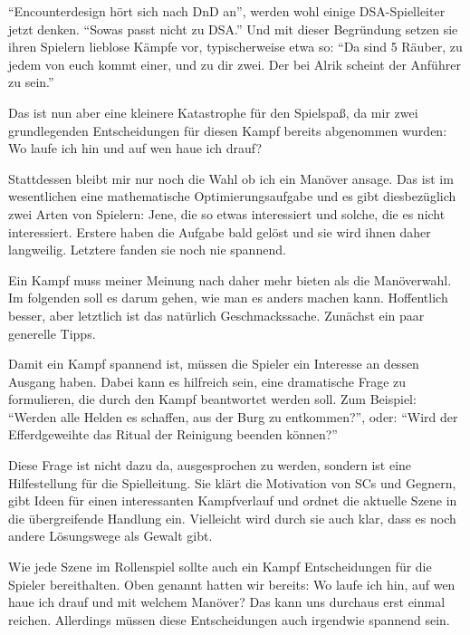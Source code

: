 



\spaltenanfang
{}
\enquote{Encounterdesign hört sich nach DnD an}, werden wohl einige DSA-Spielleiter jetzt denken. \enquote{Sowas passt nicht zu DSA.}
Und mit dieser Begründung setzen sie ihren Spielern lieblose Kämpfe vor, typischerweise etwa so:
\enquote{Da sind 5 Räuber, zu jedem von euch kommt einer, und zu dir zwei. Der bei Alrik scheint der Anführer zu sein.}

Das ist nun aber eine kleinere Katastrophe für den Spielspaß, da mir zwei grundlegenden Entscheidungen für diesen Kampf bereits abgenommen wurden:
Wo laufe ich hin und auf wen haue ich drauf?

Stattdessen bleibt mir nur noch die Wahl ob ich ein Manöver ansage.
Das ist im wesentlichen eine mathematische Optimierungsaufgabe und es gibt diesbezüglich zwei Arten von Spielern:
Jene, die so etwas interessiert und solche, die es nicht interessiert.
Erstere haben die Aufgabe bald gelöst und sie wird ihnen daher langweilig. Letztere fanden sie noch nie spannend.

Ein Kampf muss meiner Meinung nach daher mehr bieten als die Manöverwahl.
Im folgenden soll es darum gehen, wie man es anders machen kann.
Hoffentlich besser, aber letztlich ist das natürlich Geschmackssache.
Zunächst ein paar generelle Tipps.

Damit ein Kampf spannend ist, müssen die Spieler ein Interesse an dessen Ausgang haben.
Dabei kann es hilfreich sein, eine dramatische Frage zu formulieren, die durch den Kampf beantwortet werden soll.
Zum Beispiel: \enquote{Werden alle Helden es schaffen, aus der Burg zu entkommen?},
oder: \enquote{Wird der Efferdgeweihte das Ritual der Reinigung beenden können?}

Diese Frage ist nicht dazu da, ausgesprochen zu werden, sondern ist eine Hilfestellung für die Spielleitung.
Sie klärt die Motivation von SCs und Gegnern, gibt Ideen für einen interessanten Kampfverlauf und ordnet die aktuelle Szene in die übergreifende Handlung ein.
Vielleicht wird durch sie auch klar, dass es noch andere Lösungswege als Gewalt gibt.

Wie jede Szene im Rollenspiel sollte auch ein Kampf Entscheidungen für die Spieler bereithalten.
Oben genannt hatten wir bereits: Wo laufe ich hin, auf wen haue ich drauf und mit welchem Manöver?
Das kann uns durchaus erst einmal reichen.
Allerdings müssen diese Entscheidungen auch irgendwie spannend sein.

